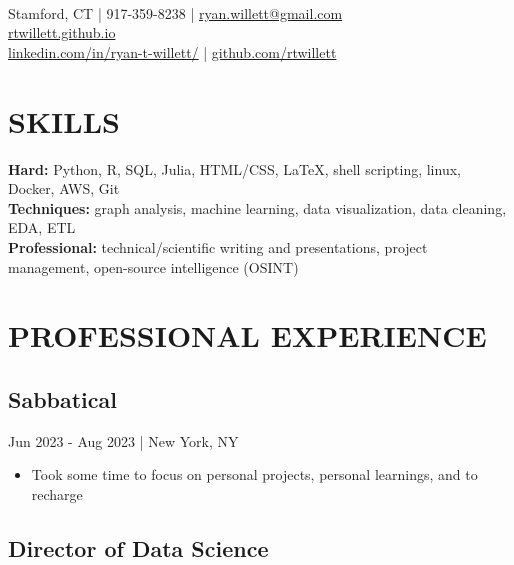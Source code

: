 \documentclass[11pt]{article}
\title{\vspace{-7cm}}
\date{}
\author{Ryan Willett}
\newenvironment{myitemize}
{ \begin{itemize}
	\setlength{\itemsep}{0pt}
	\setlength{\parskip}{0pt}
	\setlength{\parsep}{0pt}     }
{ \end{itemize}                  }
\begin{document}
\maketitle

\section*{}
  \\
\normalsize
Stamford, CT | 917-359-8238 | \href{mailto:ryan.willett@gmail.com}{ryan.willett@gmail.com} \\
\href{http://rtwillett.github.io}{rtwillett.github.io} \\
\href{https://linkedin.com/in/ryan-t-willett/}{linkedin.com/in/ryan-t-willett/} | \href{https://github.com/rtwillett}{github.com/rtwillett}

\raggedright

\section*{SKILLS}
\vspace{-3truemm}
{\bfseries Hard:} Python, R, SQL, Julia, HTML/CSS, \LaTeX, shell scripting, linux, Docker, AWS, Git \\
{\bfseries Techniques:} graph analysis, machine learning, data visualization, data cleaning, EDA, ETL \\
{\bfseries Professional:} technical/scientific writing and presentations, project management, open-source intelligence (OSINT)

\section*{PROFESSIONAL EXPERIENCE}

\subsection*{Sabbatical}
\vspace{-3truemm}

{\bfseries}Jun 2023 - Aug 2023 | New York, NY
\begin{myitemize}
	\item Took some time to focus on personal projects, personal learnings, and to recharge
\end{myitemize}

\subsection*{Director of Data Science}
\vspace{-3truemm}
\end{document}
